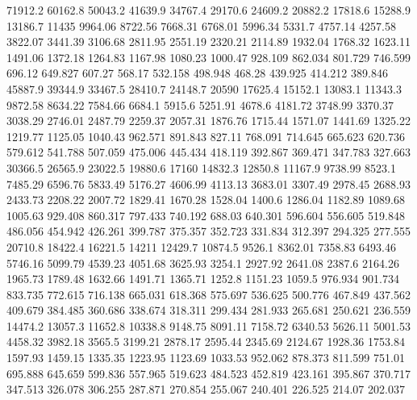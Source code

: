 71912.2      60162.8      50043.2      41639.9      34767.4      29170.6      24609.2      20882.2      17818.6      15288.9      13186.7      11435      9964.06      8722.56      7668.31      6768.01      5996.34      5331.7      4757.14      4257.58      3822.07      3441.39      3106.68      2811.95      2551.19      2320.21      2114.89      1932.04      1768.32      1623.11      1491.06      1372.18      1264.83      1167.98      1080.23      1000.47      928.109      862.034      801.729      746.599      696.12      649.827      607.27      568.17      532.158      498.948      468.28      439.925      414.212      389.846      
45887.9      39344.9      33467.5      28410.7      24148.7      20590      17625.4      15152.1      13083.1      11343.3      9872.58      8634.22      7584.66      6684.1      5915.6      5251.91      4678.6      4181.72      3748.99      3370.37      3038.29      2746.01      2487.79      2259.37      2057.31      1876.76      1715.44      1571.07      1441.69      1325.22      1219.77      1125.05      1040.43      962.571      891.843      827.11      768.091      714.645      665.623      620.736      579.612      541.788      507.059      475.006      445.434      418.119      392.867      369.471      347.783      327.663      
30366.5      26565.9      23022.5      19880.6      17160      14832.3      12850.8      11167.9      9738.99      8523.1      7485.29      6596.76      5833.49      5176.27      4606.99      4113.13      3683.01      3307.49      2978.45      2688.93      2433.73      2208.22      2007.72      1829.41      1670.28      1528.04      1400.6      1286.04      1182.89      1089.68      1005.63      929.408      860.317      797.433      740.192      688.03      640.301      596.604      556.605      519.848      486.056      454.942      426.261      399.787      375.357      352.723      331.834      312.397      294.325      277.555      
20710.8      18422.4      16221.5      14211      12429.7      10874.5      9526.1      8362.01      7358.83      6493.46      5746.16      5099.79      4539.23      4051.68      3625.93      3254.1      2927.92      2641.08      2387.6      2164.26      1965.73      1789.48      1632.66      1491.71      1365.71      1252.8      1151.23      1059.5      976.934      901.734      833.735      772.615      716.138      665.031      618.368      575.697      536.625      500.776      467.849      437.562      409.679      384.485      360.686      338.674      318.311      299.434      281.933      265.681      250.621      236.559      
14474.2      13057.3      11652.8      10338.8      9148.75      8091.11      7158.72      6340.53      5626.11      5001.53      4458.32      3982.18      3565.5      3199.21      2878.17      2595.44      2345.69      2124.67      1928.36      1753.84      1597.93      1459.15      1335.35      1223.95      1123.69      1033.53      952.062      878.373      811.599      751.01      695.888      645.659      599.836      557.965      519.623      484.523      452.819      423.161      395.867      370.717      347.513      326.078      306.255      287.871      270.854      255.067      240.401      226.525      214.07      202.037      
